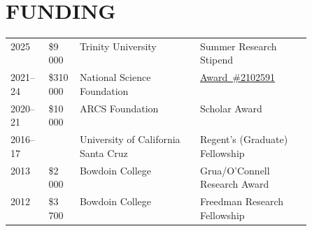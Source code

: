 \section{FUNDING}

\begin{tabular}{@{}p{.1\linewidth} p{0.1\linewidth} p{0.4\linewidth} @{}p{.4\linewidth}} 
    2025 & \$9\,000 & Trinity University & Summer Research Stipend\\
    2021--24 & \$310\,000 & National Science Foundation & \href{https://www.nsf.gov/awardsearch/showAward?AWD_ID=2102591}{Award~\#2102591}\\
    2020--21 & \$10\,000 & ARCS Foundation & Scholar Award \\
    2016--17 &  & University of California Santa Cruz  & Regent's (Graduate) Fellowship \\
    2013 & \$2\,000 & Bowdoin College & Grua/O'Connell Research Award  \\ 
    2012 & \$3\,700 & Bowdoin College & Freedman Research Fellowship \\
\end{tabular}